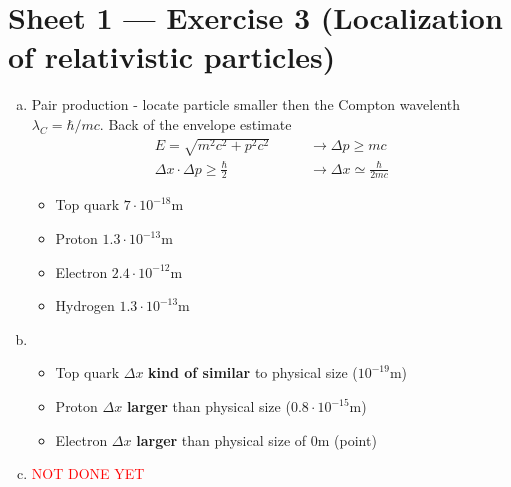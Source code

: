 \documentclass[10pt,a4paper]{report}
\theoremstyle{definition}
\begin{document}
\begin{enumerate}[a)]
\begin{center}
\begin{tikzpicture}[scale=1.2][!]
\end{tikzpicture}
\end{center}


\end{enumerate}


\section{Sheet 1 — Exercise 3 (Localization of relativistic particles)}
\begin{enumerate}[a)]
\item Pair production - locate particle smaller then the Compton wavelenth $\lambda_C=\hbar/mc$. Back of the envelope estimate
\begin{align}
E=\sqrt{m^2c^2+p^2c^2}\qquad&\rightarrow\Delta p\geq mc\\
\Delta x \cdot\Delta p\geq\frac{\hbar}{2}\qquad&\rightarrow\Delta x \simeq\frac{\hbar}{2mc}
\end{align}
\begin{itemize}
\item Top quark $7\cdot10^{-18}$m
\item Proton $1.3\cdot10^{-13}$m
\item Electron $2.4\cdot10^{-12}$m
\item Hydrogen $1.3\cdot10^{-13}$m
\end{itemize}

\item
\begin{itemize}
\item Top quark $\Delta x $ {\bf kind of similar} to physical size ($10^{-19}$m)
\item Proton $\Delta x $ {\bf larger} than physical size ($0.8\cdot10^{-15}$m)
\item Electron $\Delta x $ {\bf larger} than physical size of 0m (point)
\end{itemize}

\item \textcolor{red}{NOT DONE YET}

\end{enumerate}
\end{document}
